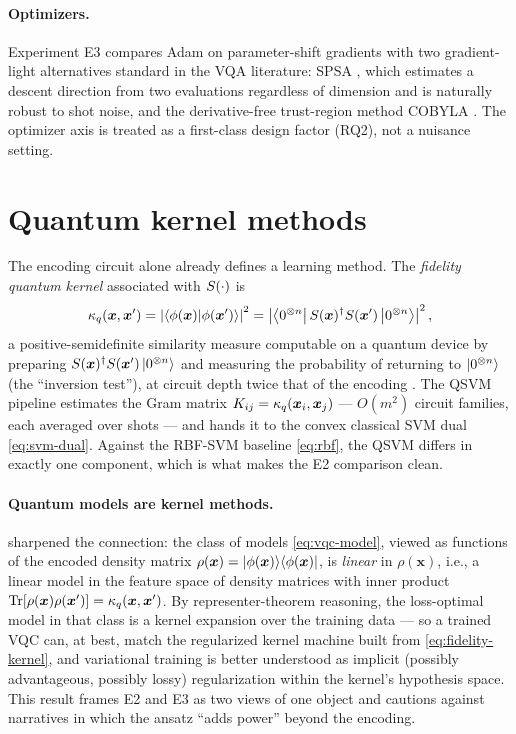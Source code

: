 \paragraph{Optimizers.} Experiment E3 compares Adam \citep{kingma2015adam} on
parameter-shift gradients with two gradient-light alternatives standard in
the VQA literature: SPSA \citep{spall1992spsa}, which estimates a descent
direction from two evaluations regardless of dimension and is naturally robust
to shot noise, and the derivative-free trust-region method COBYLA
\citep{powell1994cobyla}. The optimizer axis is treated as a first-class
design factor (RQ2), not a nuisance setting.

\section{Quantum kernel methods}
\label{sec:qml-kernels}

The encoding circuit alone already defines a learning method. The
\emph{fidelity quantum kernel} associated with $S(\cdot)$ is
\begin{equation}
  \kappa_q(\bm{x}, \bm{x}')
  = \left\lvert \left\langle\phi(\bm{x})\middle|\phi(\bm{x}')\right\rangle \right\rvert^2
  = \left\lvert \left\langle0^{\otimes n}\right| S(\bm{x})^{\dagger} S(\bm{x}')
          \left|0^{\otimes n}\right\rangle \right\rvert^2,
  \label{eq:fidelity-kernel}
\end{equation}
a positive-semidefinite similarity measure computable on a quantum device by
preparing $S(\bm{x})^{\dagger} S(\bm{x}') \left|0^{\otimes n}\right\rangle$ and
measuring the probability of returning to $\left|0^{\otimes n}\right\rangle$ (the
``inversion test''), at circuit depth twice that of the encoding
\citep{havlicek2019kernels, schuld2019hilbert}. The QSVM pipeline estimates
the Gram matrix $K_{ij} = \kappa_q(\bm{x}_i, \bm{x}_j)$ --- $O(m^2)$ circuit
families, each averaged over shots --- and hands it to the convex classical
SVM dual \eqref{eq:svm-dual}. Against the RBF-SVM baseline
\eqref{eq:rbf}, the QSVM differs in exactly one component, which is what
makes the E2 comparison clean.

\paragraph{Quantum models are kernel methods.}
\citet{schuld2021kernels} sharpened the connection: the class of models
\eqref{eq:vqc-model}, viewed as functions of the encoded density matrix
$\rho(\bm{x}) = \left|\phi(\bm{x})\middle\rangle\middle\langle\phi(\bm{x})\right|$, is \emph{linear} in
$\rho(\bm{x})$, i.e., a linear model in the feature space of density matrices
with inner product $\mathrm{Tr}[\rho(\bm{x}) \rho(\bm{x}')] = \kappa_q(\bm{x},
\bm{x}')$. By representer-theorem reasoning, the loss-optimal model in that
class is a kernel expansion over the training data --- so a trained VQC can,
at best, match the regularized kernel machine built from
\eqref{eq:fidelity-kernel}, and variational training is better understood as
implicit (possibly advantageous, possibly lossy) regularization within the
kernel's hypothesis space. This result frames E2 and E3 as two views of one
object and cautions against narratives in which the ansatz ``adds power''
beyond the encoding.

